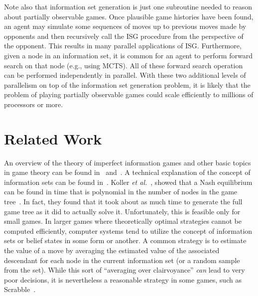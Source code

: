 \documentclass[10pt, conference, compsocconf]{IEEEtran}
\newcommand{\etal}{{\em et al.}\ }
\begin{document}
Note also that information set generation is just one subroutine needed to
reason about partially observable games.  Once plausible game histories have
been found, an agent may simulate some sequences of moves up to previous moves
made by opponents and then recursively call the ISG procedure from the
perspective of the opponent.  This results in many parallel applications of
ISG. Furthermore, given a node in an information set, it is common for an agent
to perform forward search on that node (e.g., using MCTS).  All of these
forward search operation can be performed independently in parallel. With these
two additional levels of parallelism on top of the information set generation
problem, it is likely that the problem of playing partially observable
games could scale efficiently to millions of processors or more.

\section{Related Work}
\label{Related}
An overview of the theory of imperfect information games and other basic topics
in game theory can be found in~\cite{kuhn03lectures} and~\cite{kuhn97classics}.
A technical explanation of the concept of information sets can be found
in~\cite{gilpin09algorithms}.  Koller \etal, showed that a Nash equilibrium can
be found in time that is polynomial in the number of nodes in the game
tree~\cite{koller94fast}.  In fact, they found that it took about as much time
to generate the full game tree as it did to actually solve it.  Unfortunately,
this is feasible only for small games.  In larger games where theoretically
optimal strategies cannot be computed efficiently, computer systems tend to
utilize the concept of information sets or belief states in some form or
another.  A common strategy is to estimate the value of a move by averaging the
estimated value of the associated descendant for each node in the current
information set (or a random sample from the set).  While this sort of
``averaging over clairvoyance'' {\em can} lead to very poor decisions, it is
nevertheless a reasonable strategy in some games, such as
Scrabble~\cite{sheppard02world}.
\end{document}
